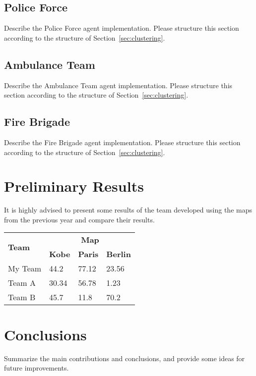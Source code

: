 \documentclass[runningheads,a4paper]{llncs}
\begin{document}
\subsection{Police Force}
\label{sec:policeForce}
Describe the Police Force agent implementation. Please structure this section according to the structure of Section~\ref{sec:clustering}.
\subsection{Ambulance Team}
\label{sec:ambulanceTeam}
Describe the Ambulance Team agent implementation. Please structure this section according to the structure of Section~\ref{sec:clustering}.
\subsection{Fire Brigade}
\label{sec:fireBrigade}
Describe the Fire Brigade agent implementation. Please structure this section according to the structure of Section~\ref{sec:clustering}.
\section{Preliminary Results}
\label{sec:results}
It is highly advised to present some results of the team developed using the maps from the previous year and compare their results.
\begin{table}
  \centering
  \begin{tabular}{llll}
    \hline
    \multirow{2}{*}{\textbf{Team}}  & \multicolumn{3}{c}{\textbf{Map}}\\
    \cline{2-4}
                                    & \textbf{Kobe} & \textbf{Paris}  & \textbf{Berlin}\\
    \hline
    My Team                         & 44.2          & 77.12           & 23.56\\
    Team A                          & 30.34         & 56.78           & 1.23\\
    Team B                          & 45.7          & 11.8            & 70.2\\
    \hline
  \end{tabular}
\end{table}
\section{Conclusions}
\label{sec:conclusions}
Summarize the main contributions and conclusions, and provide some ideas for
future improvements.


\end{document}
